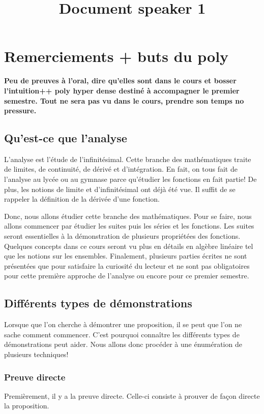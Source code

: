 \documentclass[a4paper, 12pt, french, twoside]{article}
\title{Document speaker 1}
\begin{document}
\maketitle


\section{Remerciements + buts du poly} 

\textbf{Peu de preuves à l'oral, dire qu'elles sont dans le cours et bosser l'intuition++ poly hyper dense destiné à accompagner le premier semestre. Tout ne sera pas vu dans le cours, prendre son temps no pressure.}

\subsection{Qu'est-ce que l'analyse}

L'analyse est l'étude de l'infinitésimal. Cette branche des mathématiques traite de limites, de continuité, de dérivé et d'intégration. En fait, on tous fait de l'analyse au lycée ou au gymnase parce qu'étudier les fonctions en fait partie! De plus, les notions de limite et d'infinitésimal ont déjà été vue. Il suffit de se rappeler la définition de la dérivée d'une fonction.

Donc, nous allons étudier cette branche des mathématiques. Pour se faire, nous allons commencer par étudier les suites puis les séries et les fonctions. Les suites seront essentielles à la démonstration de plusieurs propriétées des fonctions. Quelques concepts dans ce cours seront vu plus en détails en algèbre linéaire tel que les notions sur les ensembles. Finalement, plusieurs parties écrites ne sont présentées que pour satisfaire la curiosité du lecteur et ne sont pas obligatoires pour cette première approche de l'analyse ou encore pour ce premier semestre. 




\subsection{Différents types de démonstrations}

Lorsque que l'on cherche à démontrer une proposition, il se peut que l'on ne sache comment commencer. C'est pourquoi connaître les différents types de démonstrations peut aider. Nous allons donc procéder à une énumération de plusieurs techniques!


\subsubsection{Preuve directe}
Premièrement, il y a la preuve directe. Celle-ci consiste à prouver de façon directe la proposition. 
\end{document}
